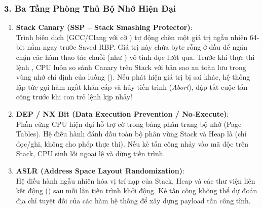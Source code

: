 \subsubsection{3. Ba Tầng Phòng Thủ Bộ Nhớ Hiện Đại}
\begin{enumerate}
  \item \textbf{Stack Canary (SSP -- Stack Smashing Protector)}: \\
  Trình biên dịch (GCC/Clang với cờ ) tự động chèn một giá trị ngẫu nhiên 64-bit nằm ngay trước Saved RBP. Giá trị này chứa byte rỗng  ở đầu để ngăn chặn các hàm thao tác chuỗi (như ) vô tình đọc lướt qua.
  Trước khi thực thi lệnh , CPU luôn so sánh Canary trên Stack với bản sao an toàn lưu trong vùng nhớ chỉ định của luồng (). Nếu phát hiện giá trị bị sai khác, hệ thống lập tức gọi hàm ngắt khẩn cấp  và hủy tiến trình (\textit{Abort}), dập tắt cuộc tấn công trước khi con trỏ lệnh kịp nhảy!
  \item \textbf{DEP / NX Bit (Data Execution Prevention / No-Execute)}: \\
  Phần cứng CPU hiện đại hỗ trợ cờ  trong bảng phân trang bộ nhớ (Page Tables). Hệ điều hành đánh dấu toàn bộ phân vùng Stack và Heap là  (chỉ đọc/ghi, không cho phép thực thi). Nếu kẻ tấn công nhảy vào mã độc trên Stack, CPU sinh lỗi ngoại lệ  và dừng tiến trình.
  \item \textbf{ASLR (Address Space Layout Randomization)}: \\
  Hệ điều hành ngẫu nhiên hóa vị trí nạp của Stack, Heap và các thư viện liên kết động () sau mỗi lần tiến trình khởi động. Kẻ tấn công không thể dự đoán địa chỉ tuyệt đối của các hàm hệ thống để xây dựng payload tấn công tĩnh.
\end{enumerate}

